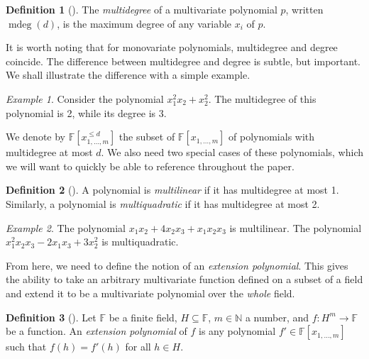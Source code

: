 \documentclass[english,12pt]{reedthesis}
\theoremstyle{plain}
\theoremstyle{definition}
\newtheorem{defn}[defn]{Definition}
\theoremstyle{remark}
\newtheorem{example}{Example}[thm]
\DeclareMathOperator{\mdeg}{mdeg}
\begin{document}
\begin{defn}[{\cite[8]{AW09}}]\label{def:mdeg}
  The \emph{multidegree} of a multivariate polynomial $p$, written $\mdeg(d)$,
  is the maximum degree of any variable $x_{i}$ of $p$.
\end{defn}

It is worth noting that for monovariate polynomials, multidegree and degree
coincide. The difference between multidegree and degree is subtle, but
important. We shall illustrate the difference with a simple example.

\begin{example}
  Consider the polynomial $x_{1}^{2}x_{2} + x_{2}^{2}$. The multidegree of this
  polynomial is 2, while its degree is 3.
\end{example}

We denote by $\mathbb{F}[x_{1, \ldots, m}^{\le d}]$ the subset of
$\mathbb{F}[x_{1, \ldots, m}]$ of polynomials with multidegree at most $d$. We also
need two special cases of these polynomials, which we will want to quickly be
able to reference throughout the paper.

\begin{defn}[{\cite[8]{AW09}}]\label{def:mlin}
  A polynomial is \emph{multilinear} if it has multidegree at most 1. Similarly,
  a polynomial is \emph{multiquadratic} if it has multidegree at most 2.
\end{defn}

\begin{example}
  The polynomial $x_{1}x_{2} + 4x_{2}x_{3} + x_{1}x_{2}x_{3}$ is multilinear. The
  polynomial $x_{1}^{2}x_{2}x_{3} - 2x_{1}x_{3} + 3x_{2}^{2}$ is multiquadratic.
\end{example}

From here, we need to define the notion of an \emph{extension polynomial}. This
gives the ability to take an arbitrary multivariate function defined on a subset
of a field and extend it to be a multivariate polynomial over the \emph{whole}
field.

\begin{defn}[{\cite[8]{AW09}}]\label{def:ext-poly}
  Let $\mathbb{F}$ be a finite field, $H \subseteq \mathbb{F}$, $m \in \mathbb{N}$ a number, and
  $f\colon H^{m} \rightarrow \mathbb{F}$ be a function. An \emph{extension polynomial} of
  $f$ is any polynomial $f' \in \mathbb{F}[x_{1, \ldots, m}]$ such that $f(h) = f'(h)$
  for all $h \in H$.
\end{defn}
\end{document}
